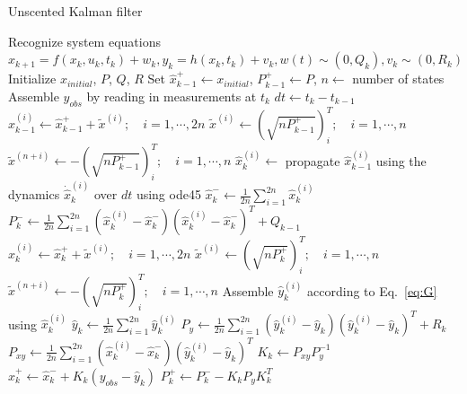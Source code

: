 \documentclass[letterpaper, paper,11pt]{AAS}	%
\begin{document}
\begin{algorithm}[H]
\footnotesize
\caption{Unscented Kalman filter\cite{Simon}}
\label{alg:UKF}
\begin{algorithmic}[1]
\State Recognize system equations $x_{k+1}=f(x_k,u_k,t_k)+w_k, y_k=h(x_k,t_k)+v_k, w(t)\sim(0,Q_k), v_k\sim(0,R_k)$
\State Initialize $x_{initial}$, $P$, $Q$, $R$
\State Set $\hat{x}_{k-1}^+ \gets x_{initial}$, $P_{k-1}^+ \gets P$, $n \gets$ number of states
    \State Assemble $y_{obs}$ by reading in measurements at $t_k$
    \State $dt \gets t_k - t_{k-1}$
    		\State $\hat{x}_{k-1}^{(i)} \gets \hat{x}_{k-1}^+ + \tilde{x}^{(i)}; \quad i=1,\cdots,2n$
    		\State $\tilde{x}^{(i)} \gets (\sqrt{nP_{k-1}^+})_i^T; \quad i=1,\cdots,n$
    		\State $\tilde{x}^{(n+i)} \gets -(\sqrt{nP_{k-1}^+})_i^T; \quad i=1,\cdots,n$
    	\EndFor
    \State $\hat{x}_k^{(i)} \gets$ propagate $\hat{x}_{k-1}^{(i)}$ using the dynamics $\dot{\hat{x}}_k^{(i)}$ over $dt$ using ode45
    \State $\hat{x}_k^- \gets \frac{1}{2n}\sum_{i=1}^{2n}\hat{x}_k^{(i)}$
    \State $P_k^- \gets \frac{1}{2n}\sum_{i=1}^{2n}(\hat{x}_k^{(i)}-\hat{x}_k^-)(\hat{x}_k^{(i)}-\hat{x}_k^-)^T + Q_{k-1}$
    		\State $\hat{x}_{k}^{(i)} \gets \hat{x}_{k}^+ + \tilde{x}^{(i)}; \quad i=1,\cdots,2n$
    		\State $\tilde{x}^{(i)} \gets (\sqrt{nP_{k}^+})_i^T; \quad i=1,\cdots,n$
    		\State $\tilde{x}^{(n+i)} \gets -(\sqrt{nP_{k}^+})_i^T; \quad i=1,\cdots,n$
    	\EndFor
    \State Assemble $\hat{y}_{k}^{(i)}$ according to Eq.~\ref{eq:G} using $\hat{x}_k^{(i)}$
    \State $\hat{y}_k \gets \frac{1}{2n}\sum_{i=1}^{2n}\hat{y}_k^{(i)}$
    \State $P_y \gets \frac{1}{2n}\sum_{i=1}^{2n}(\hat{y}_k^{(i)}-\hat{y}_k)(\hat{y}_k^{(i)}-\hat{y}_k)^T + R_k$
    \State $P_{xy} \gets \frac{1}{2n}\sum_{i=1}^{2n}(\hat{x}_k^{(i)}-\hat{x}_k^-)(\hat{y}_k^{(i)}-\hat{y}_k)^T$
    \State $K_k \gets P_{xy}P_y^{-1}$
    \State $\hat{x}_k^+ \gets \hat{x}_k^- + K_k(y_{obs}-\hat{y}_k)$
    \State $P_k^+ \gets P_k^- - K_kP_yK_k^T$
\EndFor
\end{algorithmic}
\end{algorithm}
\end{document}
